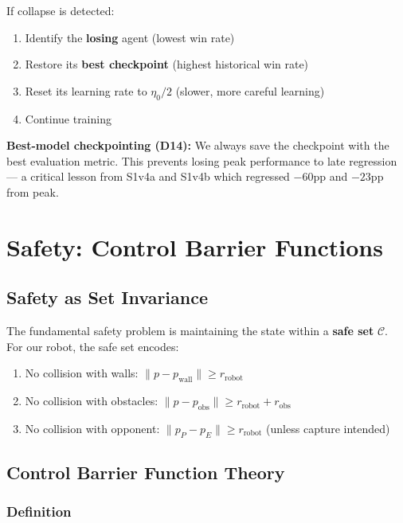 \documentclass[11pt,a4paper]{report}
\begin{document}
If collapse is detected:
\begin{enumerate}
    \item Identify the \textbf{losing} agent (lowest win rate)
    \item Restore its \textbf{best checkpoint} (highest historical win rate)
    \item Reset its learning rate to $\eta_0 / 2$ (slower, more careful learning)
    \item Continue training
\end{enumerate}

\begin{infobox}
\textbf{Best-model checkpointing (D14):} We always save the checkpoint with the best evaluation metric. This prevents losing peak performance to late regression --- a critical lesson from S1v4a and S1v4b which regressed $-60$pp and $-23$pp from peak.
\end{infobox}

\section{Safety: Control Barrier Functions}

\subsection{Safety as Set Invariance}

The fundamental safety problem is maintaining the state within a \textbf{safe set} $\mathcal{C}$. For our robot, the safe set encodes:
\begin{enumerate}
    \item No collision with walls: $\|p - p_{\text{wall}}\| \geq r_{\text{robot}}$
    \item No collision with obstacles: $\|p - p_{\text{obs}}\| \geq r_{\text{robot}} + r_{\text{obs}}$
    \item No collision with opponent: $\|p_P - p_E\| \geq r_{\text{robot}}$ (unless capture intended)
\end{enumerate}

\subsection{Control Barrier Function Theory}

\subsubsection{Definition}
\end{document}
